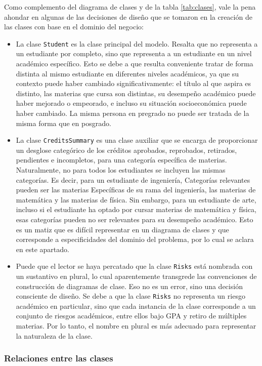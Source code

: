 Como complemento del diagrama de clases y de la tabla \ref{tab:clases}, vale la pena ahondar en algunas de las decisiones de diseño que se tomaron en la creación de las clases con base en el dominio del negocio:
\begin{itemize}
	\item La clase \texttt{Student} es la clase principal del modelo. Resalta que no representa a un estudiante por completo, sino que representa a un estudiante en un nivel académico específico. Esto se debe a que resulta conveniente tratar de forma distinta al mismo estudiante en diferentes niveles académicos, ya que su contexto puede haber cambiado significativamente: el título al que aspira es distinto, las materias que cursa son distintas, su desempeño académico puede haber mejorado o empeorado, e incluso su situación socioeconómica puede haber cambiado. La misma persona en pregrado no puede ser tratada de la misma forma que en posgrado.
	\item La clase \texttt{CreditsSummary} es una clase auxiliar que se encarga de proporcionar un desglose categórico de los créditos aprobados, reprobados, retirados, pendientes e incompletos, para una categoría específica de materias. Naturalmente, no para todos los estudiantes se incluyen las mismas categorías. Es decir, para un estudiante de ingeniería, Categorías relevantes pueden ser las materias Específicas de su rama del ingeniería, las materias de matemática y las materias de física. Sin embargo, para un estudiante de arte, incluso si el estudiante ha optado por cursar materias de matemática y física, esas categorías pueden no ser relevantes para su desempeño académico. Esto es un matiz que es difícil representar en un diagrama de clases y que corresponde a especificidades del dominio del problema, por lo cual se aclara en este apartado.
	\item Puede que el lector se haya percatado que la clase \texttt{Risks} está nombrada con un sustantivo en plural, lo cual aparentemente transgrede las convenciones de construcción de diagramas de clase. Eso no es un error, sino una decisión consciente de diseño. Se debe a que la clase \texttt{Risks} no representa un riesgo académico en particular, sino que cada instancia de la clase corresponde a un conjunto de riesgos académicos, entre ellos bajo GPA y retiro de múltiples materias. Por lo tanto, el nombre en plural es más adecuado para representar la naturaleza de la clase.
\end{itemize}

\subsubsection{Relaciones entre las clases}

